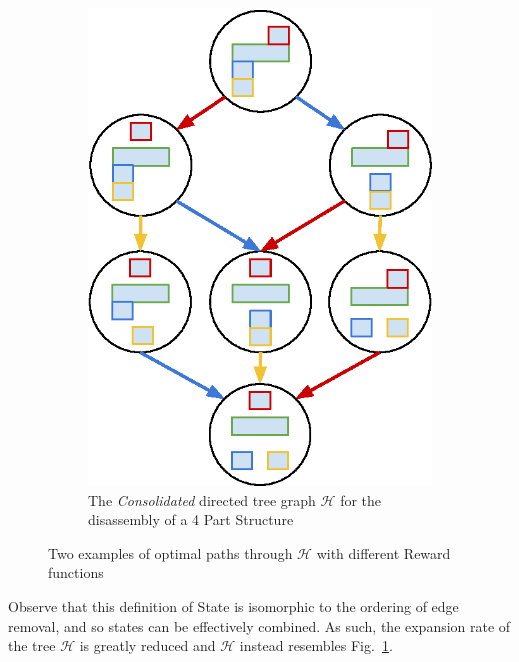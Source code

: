\documentclass{article}
\begin{document}
\begin{figure}[h!]
\begin{subfigure}[b]{0.45\textwidth}
        \includegraphics{figs/ConsolidatedSubassemblyTreeGeneration.eps}
        \caption{The \emph{Consolidated} directed tree graph $\mathcal{H}$ for the disassembly of a 4 Part Structure}
        \label{fig: treeGen2}
    \end{subfigure}
    \caption{Two examples of optimal paths through $\mathcal{H}$ with different Reward functions}
    \label{fig:TreeGens}
\end{figure}

Observe that this definition of State is isomorphic to the ordering of edge removal, and so states can be effectively combined. As such, the expansion rate of the tree $\mathcal{H}$ is greatly reduced and $\mathcal{H}$ instead resembles Fig.~\ref{fig: treeGen2}.
\end{document}
